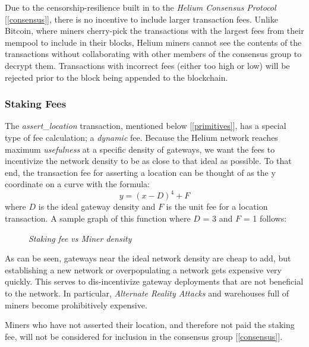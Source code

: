 \documentclass[10pt, nonatbib, nocopyrightspace, reprint]{sigplanconf}
\newcommand{\secref}[1]{[\autoref{#1}]}
\begin{document}
Due to the censorship-resilience built in to the \emph{Helium Consensus Protocol} \secref{consensus}, there is no incentive to include larger transaction fees. Unlike Bitcoin, where miners cherry-pick the transactions with the largest fees from their mempool to include in their blocks, Helium miners cannot see the contents of the transactions without collaborating with other members of the consensus group to decrypt them. Transactions with incorrect fees (either too high or low) will be rejected prior to the block being appended to the blockchain.

\subsubsection{Staking Fees} \label{staking}

The \emph{assert\_location} transaction, mentioned below \secref{primitives}, has a special type of fee calculation; a \emph{dynamic} fee. Because the Helium network reaches maximum \emph{usefulness} at a specific density of gateways, we want the fees to incentivize the network density to be as close to that ideal as possible. To that end, the transaction fee for asserting a location can be thought of as the y coordinate on a curve with the formula: \[\mathit{y = \left(x - D\right)^4 + F}\] where $D$ is the ideal gateway density and $F$ is the unit fee for a location transaction. A sample graph of this function where $D$ = 3 and $F$ = 1 follows:\\

\begin{figure}[ht]
  \centering
  \pgfplotsset{width=11cm,compat=1.9}
  \caption{\emph{Staking fee vs Miner density}}
\end{figure}


As can be seen, gateways near the ideal network density are cheap to add, but establishing a new network or overpopulating a network gets expensive very quickly. This serves to dis-incentivize gateway deployments that are not beneficial to the network. In particular, \emph{Alternate Reality Attacks} and warehouses full of miners become prohibitively expensive.

Miners who have not asserted their location, and therefore not paid the staking fee, will not be considered for inclusion in the consensus group \secref{consensus}.
\end{document}
